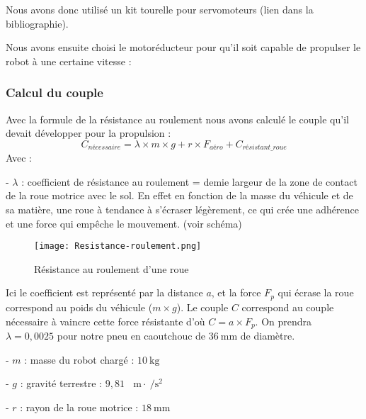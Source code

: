 \documentclass[12pt,a4paper]{article}
\begin{document}
	Nous avons donc utilisé un kit tourelle pour servomoteurs (lien dans la bibliographie).
	
	Nous avons ensuite choisi le motoréducteur pour qu'il soit capable de propulser le robot à une certaine vitesse :

	\subsubsection{Calcul du couple}
Avec la formule de la résistance au roulement nous avons calculé le couple qu'il devait développer pour la propulsion :
$$C_{\textit{nécessaire}} = \lambda \times m \times g + r \times F_{\textit{aéro}}+C_{\textit{résistant\_roue}}$$
Avec :

- $\lambda$ : coefficient de résistance au roulement = demie largeur de la zone de contact de la roue motrice avec le sol. En effet en fonction de la masse du véhicule et de sa matière, une roue à tendance à s'écraser légèrement, ce qui crée une adhérence et une force qui empêche le mouvement. (voir schéma)

	\begin{figure}[ht!]
		\centering
			\texttt{[image: Resistance-roulement.png]}
			\caption[Résistance au roulement d'une roue - Illustration publiée sous license GFDL (cf. Annexes) provenant de l'encyclopédie en ligne Wikipédia, disponible à l'adresse : \url{https://commons.wikimedia.org/wiki/File:Resistance_au_roulement_et_adherence_roue_motrice.svg}]{Résistance au roulement d'une roue\label{overflow}}
	\end{figure}
	
	Ici le coefficient est représenté par la distance $a$, et la force $F_p$ qui écrase la roue correspond au poids du véhicule ($m \times g$). Le couple $C$ correspond au couple nécessaire à vaincre cette force résistante d'où $C= a \times F_p$. On prendra  $\lambda = 0,0025$ pour notre pneu en caoutchouc de $\SI{36}{ \milli\meter}$ de diamètre.

- $m$ : masse du robot chargé : $\SI{10}{\kilogram}$

- $g$ : gravité terrestre : $9,81 \text{ }\SI{}{\meter}\cdot\SI{}{\per\second\squared}$

- $r$ : rayon de la roue motrice : $\SI{18}{\milli\meter}$
\end{document}

